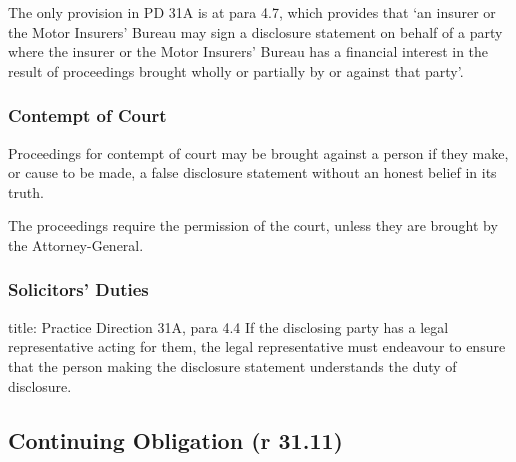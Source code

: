 \documentclass[
]{article}
\newenvironment{Shaded}{}{}
\newcommand{\NormalTok}[1]{#1}
\begin{document}
\begin{Shaded}
\begin{Highlighting}[]
\NormalTok{The only provision in PD 31A is at para 4.7, which provides that ‘an insurer or the Motor Insurers’ Bureau may sign a disclosure statement on behalf of a party where the insurer or the Motor Insurers’ Bureau has a financial interest in the result of proceedings brought wholly or partially by or against that party’.}
\end{Highlighting}
\end{Shaded}

\hypertarget{contempt-of-court}{%
\subsubsection{Contempt of Court}\label{contempt-of-court}}

\begin{Shaded}
\begin{Highlighting}[]
\NormalTok{Proceedings for contempt of court may be brought against a person if they make, or cause to be made, a false disclosure statement without an honest belief in its truth.}
\end{Highlighting}
\end{Shaded}

The proceedings require the permission of the court, unless they are
brought by the Attorney-General.

\hypertarget{solicitors-duties}{%
\subsubsection{Solicitors' Duties}\label{solicitors-duties}}

\begin{Shaded}
\begin{Highlighting}[]
\NormalTok{title: Practice Direction 31A, para 4.4}
\NormalTok{If the disclosing party has a legal representative acting for them, the legal representative must endeavour to ensure that the person making the disclosure statement understands the duty of disclosure.}
\end{Highlighting}
\end{Shaded}

\hypertarget{continuing-obligation-r-31.11}{%
\subsection{Continuing Obligation (r
31.11)}\label{continuing-obligation-r-31.11}}
\end{document}
